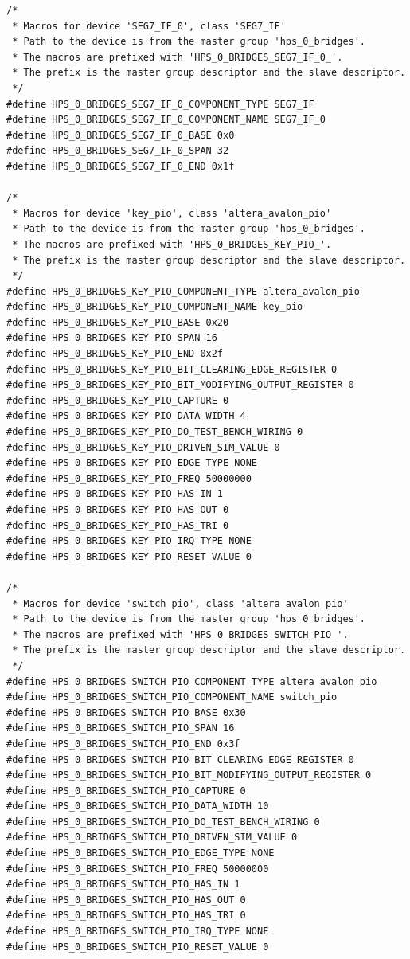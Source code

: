 \documentclass[conference]{IEEEtran}
\begin{document}
\begin{lstlisting}
/*
 * Macros for device 'SEG7_IF_0', class 'SEG7_IF'
 * Path to the device is from the master group 'hps_0_bridges'.
 * The macros are prefixed with 'HPS_0_BRIDGES_SEG7_IF_0_'.
 * The prefix is the master group descriptor and the slave descriptor.
 */
#define HPS_0_BRIDGES_SEG7_IF_0_COMPONENT_TYPE SEG7_IF
#define HPS_0_BRIDGES_SEG7_IF_0_COMPONENT_NAME SEG7_IF_0
#define HPS_0_BRIDGES_SEG7_IF_0_BASE 0x0
#define HPS_0_BRIDGES_SEG7_IF_0_SPAN 32
#define HPS_0_BRIDGES_SEG7_IF_0_END 0x1f

/*
 * Macros for device 'key_pio', class 'altera_avalon_pio'
 * Path to the device is from the master group 'hps_0_bridges'.
 * The macros are prefixed with 'HPS_0_BRIDGES_KEY_PIO_'.
 * The prefix is the master group descriptor and the slave descriptor.
 */
#define HPS_0_BRIDGES_KEY_PIO_COMPONENT_TYPE altera_avalon_pio
#define HPS_0_BRIDGES_KEY_PIO_COMPONENT_NAME key_pio
#define HPS_0_BRIDGES_KEY_PIO_BASE 0x20
#define HPS_0_BRIDGES_KEY_PIO_SPAN 16
#define HPS_0_BRIDGES_KEY_PIO_END 0x2f
#define HPS_0_BRIDGES_KEY_PIO_BIT_CLEARING_EDGE_REGISTER 0
#define HPS_0_BRIDGES_KEY_PIO_BIT_MODIFYING_OUTPUT_REGISTER 0
#define HPS_0_BRIDGES_KEY_PIO_CAPTURE 0
#define HPS_0_BRIDGES_KEY_PIO_DATA_WIDTH 4
#define HPS_0_BRIDGES_KEY_PIO_DO_TEST_BENCH_WIRING 0
#define HPS_0_BRIDGES_KEY_PIO_DRIVEN_SIM_VALUE 0
#define HPS_0_BRIDGES_KEY_PIO_EDGE_TYPE NONE
#define HPS_0_BRIDGES_KEY_PIO_FREQ 50000000
#define HPS_0_BRIDGES_KEY_PIO_HAS_IN 1
#define HPS_0_BRIDGES_KEY_PIO_HAS_OUT 0
#define HPS_0_BRIDGES_KEY_PIO_HAS_TRI 0
#define HPS_0_BRIDGES_KEY_PIO_IRQ_TYPE NONE
#define HPS_0_BRIDGES_KEY_PIO_RESET_VALUE 0

/*
 * Macros for device 'switch_pio', class 'altera_avalon_pio'
 * Path to the device is from the master group 'hps_0_bridges'.
 * The macros are prefixed with 'HPS_0_BRIDGES_SWITCH_PIO_'.
 * The prefix is the master group descriptor and the slave descriptor.
 */
#define HPS_0_BRIDGES_SWITCH_PIO_COMPONENT_TYPE altera_avalon_pio
#define HPS_0_BRIDGES_SWITCH_PIO_COMPONENT_NAME switch_pio
#define HPS_0_BRIDGES_SWITCH_PIO_BASE 0x30
#define HPS_0_BRIDGES_SWITCH_PIO_SPAN 16
#define HPS_0_BRIDGES_SWITCH_PIO_END 0x3f
#define HPS_0_BRIDGES_SWITCH_PIO_BIT_CLEARING_EDGE_REGISTER 0
#define HPS_0_BRIDGES_SWITCH_PIO_BIT_MODIFYING_OUTPUT_REGISTER 0
#define HPS_0_BRIDGES_SWITCH_PIO_CAPTURE 0
#define HPS_0_BRIDGES_SWITCH_PIO_DATA_WIDTH 10
#define HPS_0_BRIDGES_SWITCH_PIO_DO_TEST_BENCH_WIRING 0
#define HPS_0_BRIDGES_SWITCH_PIO_DRIVEN_SIM_VALUE 0
#define HPS_0_BRIDGES_SWITCH_PIO_EDGE_TYPE NONE
#define HPS_0_BRIDGES_SWITCH_PIO_FREQ 50000000
#define HPS_0_BRIDGES_SWITCH_PIO_HAS_IN 1
#define HPS_0_BRIDGES_SWITCH_PIO_HAS_OUT 0
#define HPS_0_BRIDGES_SWITCH_PIO_HAS_TRI 0
#define HPS_0_BRIDGES_SWITCH_PIO_IRQ_TYPE NONE
#define HPS_0_BRIDGES_SWITCH_PIO_RESET_VALUE 0


\end{lstlisting}
\end{document}
